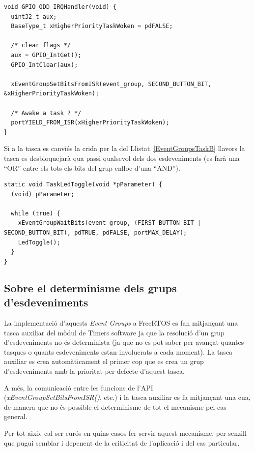 \begin{lstlisting}[style=customc,caption=ISR notificant un esdeveniment a un grup,label=EventGroupsISR]
void GPIO_ODD_IRQHandler(void) {
  uint32_t aux;
  BaseType_t xHigherPriorityTaskWoken = pdFALSE;

  /* clear flags */
  aux = GPIO_IntGet();
  GPIO_IntClear(aux);

  xEventGroupSetBitsFromISR(event_group, SECOND_BUTTON_BIT, &xHigherPriorityTaskWoken);

  /* Awake a task ? */
  portYIELD_FROM_ISR(xHigherPriorityTaskWoken);
}
\end{lstlisting}

Si a la tasca es canviés la crida per la del Llistat~\ref{EventGroupsTaskB} llavors la tasca es desbloquejarà qua passi qualsevol dels dos esdeveniments (es farà una ``OR'' entre els tots els bits del grup enlloc d'una ``AND'').
\begin{lstlisting}[style=customc,caption=Tasca esperant un grup d'esdeveniments  (OR),label=EventGroupsTaskB]
static void TaskLedToggle(void *pParameter) {
  (void) pParameter;

  while (true) {
    xEventGroupWaitBits(event_group, (FIRST_BUTTON_BIT | SECOND_BUTTON_BIT), pdTRUE, pdFALSE, portMAX_DELAY);
    LedToggle();
  }
}
\end{lstlisting}

\subsection{Sobre el determinisme dels grups d'esdeveniments}
La implementació d'aquests {\em Event Groups} a FreeRTOS es fan mitjançant una tasca auxiliar del mòdul de Timers software ja que la resolució d'un grup d'esdeveniments no és determinista (ja que no es pot saber per avançat quantes tasques o quants esdeveniments estan involucrats a cada moment). La tasca auxiliar es crea automàticament el primer cop que es crea un grup d'esdeveniments amb la prioritat per defecte d'aquest tasca. 

A més, la comunicació entre les funcions de l'API ({\em xEventGroupSetBitsFromISR()}, etc.) i la tasca auxiliar es fa mitjançant una cua, de manera que no és possible el determinisme de tot el mecanisme pel cas general. 

Per tot això, cal ser curós en quins casos fer servir aquest mecanisme, per senzill que pugui semblar i depenent de la criticitat de l'aplicació i del cas particular.


